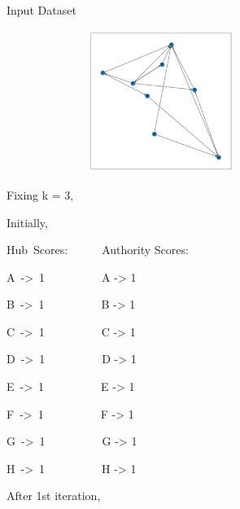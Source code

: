 \documentclass[12pt]{article}
\renewcommand{\_}{\kern-1.5pt\textunderscore\kern-1.5pt}
\begin{document}
Input Dataset\par




\begin{figure}[H]
	\begin{Center}
		\includegraphics[width=3.12in,height=1.82in]{./media/image1.png}
	\end{Center}
\end{figure}



\par

Fixing k = 3, \par

\setlength{\parskip}{7.44pt}
Initially,\par

Hub\ Scores:\ \ \ \ \ \   Authority Scores:\par

A\ ->\ 1\ \ \ \ \ \ \ \ \ \    A -> 1\par

B\ ->\ 1\ \ \ \ \ \ \ \ \ \    B -> 1\par

C\ ->\ 1\ \ \ \ \ \ \ \ \ \    C -> 1\par

D\ ->\ 1\ \ \ \ \ \ \ \ \ \    D -> 1\par

E\ ->\ 1\ \ \ \ \ \ \ \ \ \    E -> 1\par

F\ ->\ 1\ \ \ \ \ \ \ \ \ \    F -> 1\par

G\ ->\ 1\ \ \ \ \ \ \ \ \ \    G -> 1\par

H\ ->\ 1\ \ \ \ \ \ \ \ \ \    H -> 1\par


\vspace{\baselineskip}After 1st iteration,\par
\end{document}
